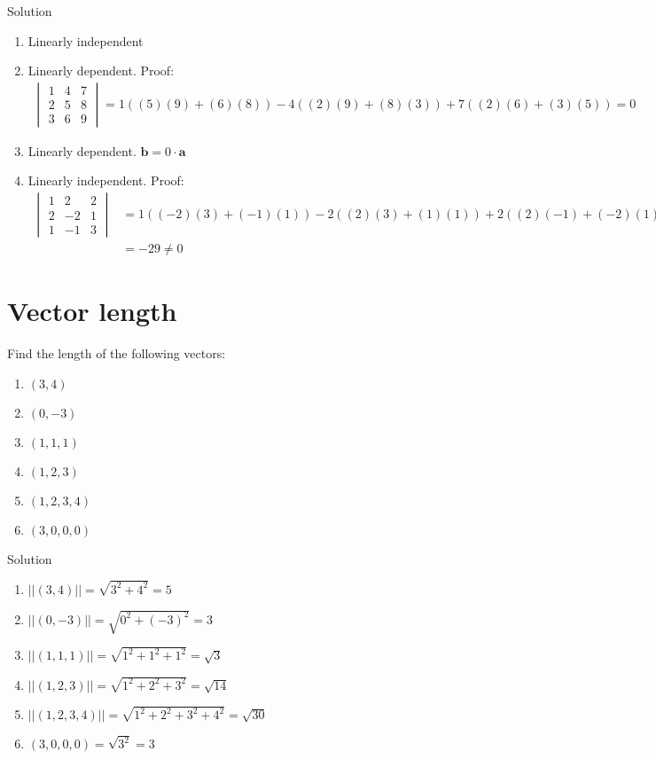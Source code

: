 \documentclass[12pt]{article}
\begin{document}
Solution
\begin{enumerate}
    \item Linearly independent 
    \item Linearly dependent. Proof:
     \begin{align*}
        \begin{vmatrix}
           1 &4&7
             \\ 2 & 5&8 \\
            3&6&9
        \end{vmatrix} = 1\left((5)(9) + (6)(8) \right) - 4\left( (2)(9) + (8)(3)\right) + 7\left( (2)(6) + (3)(5)\right) =0
    \end{align*}
    \item Linearly dependent. $\mathbf{b} = 0\cdot \mathbf{a}$
    \item Linearly independent. Proof:
     \begin{align*}
         \begin{vmatrix}
            1 &2&2
             \\ 2 & -2 & 1 \\
            1&-1&3
        \end{vmatrix}
        &= 1 \left((-2)(3) + (-1)(1)\right) -2 \left( (2)(3) + (1)(1)\right) + 2\left( (2)(-1)+(-2)(1)\right) 
        \\ &= -29 \neq 0
    \end{align*}
\end{enumerate}

\section{Vector length}
Find the length of the following vectors:
\begin{enumerate}
    \item $(3,4)$
    \item $(0,-3)$
    \item $(1,1,1)$
    \item $(1,2,3)$
    \item $(1,2,3,4)$
    \item $(3,0,0,0)$
\end{enumerate}
Solution
\begin{enumerate}
    \item $||(3,4)|| = \sqrt{3^2+4^2} = 5$
    \item $||(0,-3)|| = \sqrt{0^2 + (-3)^2} = 3$
    \item $||(1,1,1)|| = \sqrt{1^2+1^2+1^2} = \sqrt{3}$
    \item $||(1,2,3)|| = \sqrt{1^2+2^2+3^2} = \sqrt{14}$
    \item $||(1,2,3,4)|| = \sqrt{1^2+2^2+3^2+4^2} = \sqrt{30}$
    \item $(3,0,0,0) = \sqrt{3^2}=3$
\end{enumerate}
\end{document}
